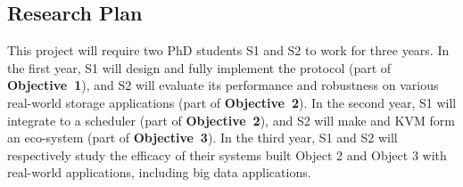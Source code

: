% 

\vspace{-.15in}\subsection{Research Plan} \label{sec:plan}\vspace{-.075in}

This project will require two PhD students S1 and S2 to work for 
three years. In the first year, S1 will design and fully implement the \falcon 
protocol (part of \textbf{Objective~1}), and S2 will evaluate its performance 
and robustness on various real-world storage applications (part of 
\textbf{Objective~2}). In the second year, S1 will 
integrate \falcon to a scheduler \mesos (part of \textbf{Objective~2}), and S2 
will make \falcon and KVM form an eco-system (part of \textbf{Objective~3}). In 
the third year, S1 and S2 will respectively study the efficacy of their systems 
built Object 2 and Object 3 with real-world applications, including big data 
applications.


